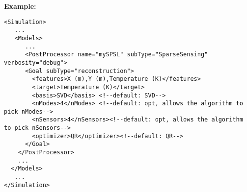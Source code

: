 \textbf{Example:}
\begin{lstlisting}[style=XML]
<Simulation>
   ...
   <Models>
      ...
      <PostProcessor name="mySPSL" subType="SparseSensing" verbosity="debug">
      <Goal subType="reconstruction">
        <features>X (m),Y (m),Temperature (K)</features>
        <target>Temperature (K)</target>
        <basis>SVD</basis> <!--default: SVD-->
        <nModes>4</nModes> <!--default: opt, allows the algorithm to pick nModes-->
        <nSensors>4</nSensors><!--default: opt, allows the algorithm to pick nSensors-->
        <optimizer>QR</optimizer><!--default: QR-->
      </Goal>
    </PostProcessor>
    ...
  </Models>
   ...
</Simulation>
\end{lstlisting}
